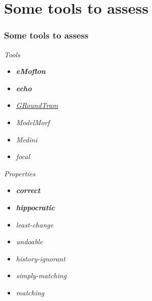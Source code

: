 \documentclass{beamer}
\begin{document}
\section{Some tools to assess}
\begin{frame}
\frametitle{Some tools to assess}
\begin{footnotesize}
\textit{Tools}
\begin{itemize}
\item \textit{\textbf{eMoflon}} \cite{eMoflon}

\item \textit{\textbf{echo}} \cite{echotool}

\item \textit{\underline{GRoundTram}} \cite{GRoundTram}
 
\item \textit{ModelMorf} \cite{ModelMorf}

\item \textit{Medini} \cite{medini}

\item \textit{focal} \cite{focal}
\end{itemize}
\textit{Properties}
\begin{itemize}
\item \textit{\textbf{correct}} 

\item \textit{\textbf{hippocratic}} 

\item \textit{least-change}

\item \textit{undoable}

\item \textit{history-ignorant}

\item \textit{simply-matching}

\item \textit{matching}
\end{itemize}
\end{footnotesize}

\end{frame}


\end{document}
